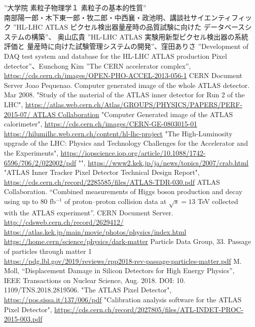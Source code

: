\begin{thebibliography}{24}
”大学院 素粒子物理学１ 素粒子の基本的性質” \\ 南部陽一郎・木下東一郎・牧二郎・中西襄・政池明、講談社サイエンティフィック
”HL-LHC ATLAS ピクセル検出器量産時の品質試験に向けた データベースシステムの構築”、 奥山広貴
”HL-LHC ATLAS 実験用新型ピクセル検出器の系統評価と 量産時に向けた試験管理システムの開発”、窪田ありさ
”Development of DAQ test system and database for the HL-LHC ATLAS production Pixel detector”、Eunchong Kim
”The CERN accelerator complex”,\\ \url{https://cds.cern.ch/images/OPEN-PHO-ACCEL-2013-056-1} CERN Document Server
Joao Pequenao. Computer generated image of the whole ATLAS detector. Mar 2008.
"Study of the material of the ATLAS inner detector for Run 2 of the LHC", \url{https://atlas.web.cern.ch/Atlas/GROUPS/PHYSICS/PAPERS/PERF-2015-07/ ATLAS Collaboration}
"Computer Generated image of the ATLAS calorimeter", \url{https://cds.cern.ch/images/CERN-GE-0803015-01}
\url{https://hilumilhc.web.cern.ch/content/hl-lhc-project}
"The High-Luminosity upgrade of the LHC: Physics and Technology Challenges for the Accelerator and the Experiments", \url{https://iopscience.iop.org/article/10.1088/1742-6596/706/2/022002/pdf}
"", \url{https://www2.kek.jp/ja/news/topics/2007/crab.html}
"ATLAS Inner Tracker Pixel Detector Technical Design Report", \url{https://cds.cern.ch/record/2285585/files/ATLAS-TDR-030.pdf}
ATLAS Collaboration. “Combined measurements of Higgs boson production and decay using up to $80$ fb$^{-1}$ of proton–proton collision data at $\sqrt{s}=13$ TeV collected with the ATLAS experiment”. CERN Document Server. \url{http://cdsweb.cern.ch/record/2629412/}
\url{https://atlas.kek.jp/main/movie/photos/physics/index.html}
\url{https://home.cern/science/physics/dark-matter}
Particle Data Group, 33. Passage of particles through matter 1\\
\url{https://pdg.lbl.gov/2019/reviews/rpp2018-rev-passage-particles-matter.pdf}
M. Moll, “Displacement Damage in Silicon Detectors for High Energy Physics”, IEEE Transactions on Nuclear Science, Aug. 2018. DOI: 10. 1109/TNS.2018.2819506.
"The ATLAS Pixel Detector", \url{https://pos.sissa.it/137/006/pdf}
"Calibration analysis software for the ATLAS Pixel Detector", \url{https://cds.cern.ch/record/2027805/files/ATL-INDET-PROC-2015-003.pdf}

\end{thebibliography}

